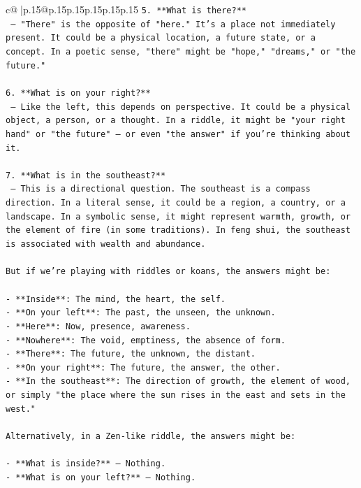 \documentclass{article}
\begin{document}
{\begin{supertabular}{c@{$\;$}|p{.15\linewidth}@{}p{.15\linewidth}p{.15\linewidth}p{.15\linewidth}p{.15\linewidth}p{.15\linewidth}}
{{{\texttt{5. **What is there?**  } \\
\texttt{   — "There" is the opposite of "here." It's a place not immediately present. It could be a physical location, a future state, or a concept. In a poetic sense, "there" might be "hope," "dreams," or "the future."} \\
\\ 
\texttt{6. **What is on your right?**  } \\
\texttt{   — Like the left, this depends on perspective. It could be a physical object, a person, or a thought. In a riddle, it might be "your right hand" or "the future" — or even "the answer" if you're thinking about it.} \\
\\ 
\texttt{7. **What is in the southeast?**  } \\
\texttt{   — This is a directional question. The southeast is a compass direction. In a literal sense, it could be a region, a country, or a landscape. In a symbolic sense, it might represent warmth, growth, or the element of fire (in some traditions). In feng shui, the southeast is associated with wealth and abundance.} \\
\\ 
\texttt{But if we're playing with riddles or koans, the answers might be:} \\
\\ 
\texttt{{-} **Inside**: The mind, the heart, the self.} \\
\texttt{{-} **On your left**: The past, the unseen, the unknown.} \\
\texttt{{-} **Here**: Now, presence, awareness.} \\
\texttt{{-} **Nowhere**: The void, emptiness, the absence of form.} \\
\texttt{{-} **There**: The future, the unknown, the distant.} \\
\texttt{{-} **On your right**: The future, the answer, the other.} \\
\texttt{{-} **In the southeast**: The direction of growth, the element of wood, or simply "the place where the sun rises in the east and sets in the west."} \\
\\ 
\texttt{Alternatively, in a Zen{-}like riddle, the answers might be:} \\
\\ 
\texttt{{-} **What is inside?** — Nothing.} \\
\texttt{{-} **What is on your left?** — Nothing.} \\
}}}
\end{supertabular}}
\end{document}
